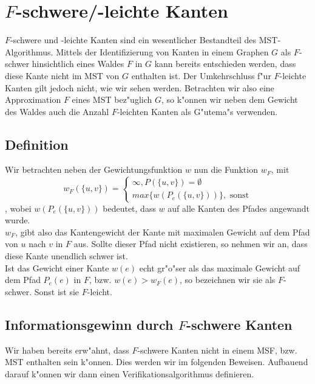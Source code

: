 \section{$F$-schwere/-leichte Kanten}

$F$-schwere und -leichte Kanten sind ein wesentlicher Bestandteil des 
    MST-Algorithmus. Mittels der Identifizierung von Kanten in einem Graphen $G$
    als $F$-schwer hinsichtlich eines Waldes $F$ in $G$ kann
    bereits entschieden werden, dass diese Kante nicht im MST von $G$ enthalten
    ist. Der Umkehrschluss f"ur $F$-leichte Kanten gilt jedoch nicht, wie wir
    sehen werden.
    Betrachten wir also eine Approximation $F$ eines MST bez"uglich $G$, so k"onnen
    wir neben dem Gewicht des Waldes auch die Anzahl $F$-leichten Kanten als
    G"utema"s verwenden.\\

\subsection{Definition}

Wir betrachten neben der Gewichtungsfunktion $w$ nun die Funktion $w_F$, mit
    $$
    w_F(\{u,v\}) =  \begin{cases}
                        \infty, P(\{u,v\}) = \emptyset\\
                        max\{w(P_e(\{u,v\}))\}, \text{ sonst}
                    \end{cases}
    $$
, wobei $w(P_e(\{u,v\}))$ bedeutet, dass $w$ auf alle Kanten des Pfades angewandt
    wurde.\\
$w_F$, gibt also das Kantengewicht der Kante mit maximalen Gewicht auf dem
    Pfad von $u$ nach $v$ in $F$ aus. Sollte dieser Pfad nicht existieren, so
    nehmen wir an, dass diese Kante unendlich schwer ist.\\
Ist das Gewicht einer Kante $w(e)$ echt gr"o"ser als das maximale Gewicht auf dem 
    Pfad $P_e(e)$ in $F$, bzw. $w(e) > w_F(e)$, 
    so bezeichnen wir sie als $F$-schwer.
    Sonst ist sie $F$-leicht.

\subsection{Informationsgewinn durch $F$-schwere Kanten}

Wir haben bereits erw"ahnt, dass $F$-schwere Kanten nicht in einem MSF, bzw. MST
    enthalten sein k"onnen.
    Dies werden wir im folgenden Beweisen.
    Aufbauend darauf k"onnen wir dann einen Verifikationsalgorithmus definieren.\\

